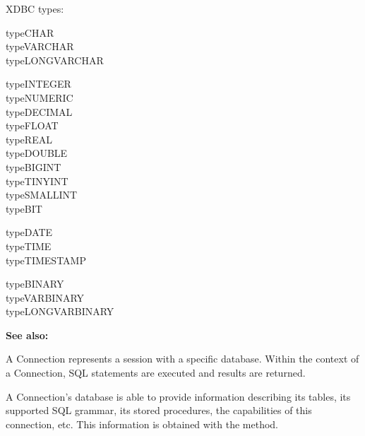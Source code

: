 XDBC types:

\begin{description}
\item[typeCHAR]
\item[typeVARCHAR]
\item[typeLONGVARCHAR]
\end{description}

\begin{description}
\item[typeINTEGER]
\item[typeNUMERIC]
\item[typeDECIMAL]
\item[typeFLOAT]
\item[typeREAL]
\item[typeDOUBLE]
\item[typeBIGINT]
\item[typeTINYINT]
\item[typeSMALLINT]
\item[typeBIT]
\end{description}

\begin{description}
\item[typeDATE]
\item[typeTIME]
\item[typeTIMESTAMP]
\end{description}

\begin{description}
\item[typeBINARY]
\item[typeVARBINARY]
\item[typeLONGVARBINARY]
\end{description}

{\bf See also: }


\renewcommand{\CurClass}{Connection}
\Class{}

A Connection represents a session with a specific database.
Within the context of a Connection, SQL statements are executed and
results are returned.

A Connection's database is able to provide information describing
its tables, its supported SQL grammar, its stored procedures,
the capabilities of this connection, etc. This information is obtained
with the  method.

